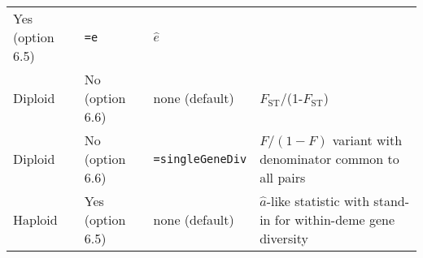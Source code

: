 \documentclass[12pt,]{book}
\theoremstyle{definition}
\theoremstyle{definition}
\theoremstyle{definition}
\theoremstyle{remark}
\begin{document}
\begin{longtable}[]{@{}llll@{}}
\begin{minipage}[t]{0.16\columnwidth}
Yes (option 6.5)\strut
\end{minipage} & \begin{minipage}[t]{0.19\columnwidth}\raggedright\strut
\texttt{=e}\strut
\end{minipage} & \begin{minipage}[t]{0.45\columnwidth}\raggedright\strut
\(\hat{e}\)\strut
\end{minipage}\tabularnewline
\begin{minipage}[t]{0.08\columnwidth}\raggedright\strut
Diploid\strut
\end{minipage} & \begin{minipage}[t]{0.16\columnwidth}\raggedright\strut
No (option 6.6)\strut
\end{minipage} & \begin{minipage}[t]{0.19\columnwidth}\raggedright\strut
none (default)\strut
\end{minipage} & \begin{minipage}[t]{0.45\columnwidth}\raggedright\strut
\(F_\mathrm{ST}\)/(1-\(F_\mathrm{ST}\))\strut
\end{minipage}\tabularnewline
\begin{minipage}[t]{0.08\columnwidth}\raggedright\strut
Diploid\strut
\end{minipage} & \begin{minipage}[t]{0.16\columnwidth}\raggedright\strut
No (option 6.6)\strut
\end{minipage} & \begin{minipage}[t]{0.19\columnwidth}\raggedright\strut
\texttt{=singleGeneDiv}\strut
\end{minipage} & \begin{minipage}[t]{0.45\columnwidth}\raggedright\strut
\(F/(1-F)\) variant with denominator common to all pairs\strut
\end{minipage}\tabularnewline
\begin{minipage}[t]{0.08\columnwidth}\raggedright\strut
Haploid\strut
\end{minipage} & \begin{minipage}[t]{0.16\columnwidth}\raggedright\strut
Yes (option 6.5)\strut
\end{minipage} & \begin{minipage}[t]{0.19\columnwidth}\raggedright\strut
none (default)\strut
\end{minipage} & \begin{minipage}[t]{0.45\columnwidth}\raggedright\strut
\(\hat{a}\)-like statistic with stand-in for within-deme gene
diversity\strut

\end{minipage}
\end{longtable}
\end{document}

